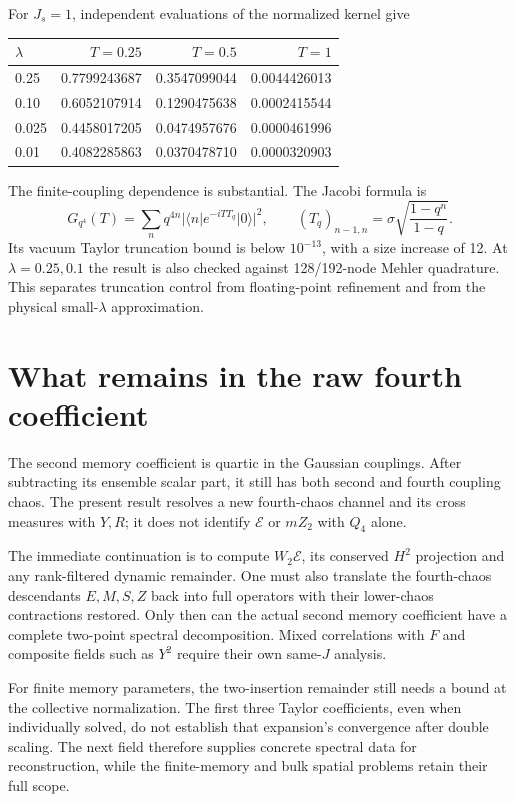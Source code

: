 \documentclass[11pt,a4paper]{article}
\begin{document}
For $J_s=1$, independent evaluations of the normalized kernel give
\begin{center}\begin{tabular}{lrrr}\toprule
$\lambda$ & $T=0.25$ & $T=0.5$ & $T=1$ \\\midrule
0.25 & 0.7799243687 & 0.3547099044 & 0.0044426013 \\
0.10 & 0.6052107914 & 0.1290475638 & 0.0002415544 \\
0.025 & 0.4458017205 & 0.0474957676 & 0.0000461996 \\
0.01 & 0.4082285863 & 0.0370478710 & 0.0000320903 \\\bottomrule
\end{tabular}\end{center}
The finite-coupling dependence is substantial. The Jacobi formula is
\begin{equation}
G_{q^4}(T)=\sum_nq^{4n}|\langle n|e^{-iTT_q}|0\rangle|^2,
\qquad (T_q)_{n-1,n}=\sigma\sqrt{\frac{1-q^n}{1-q}}.
\end{equation}
Its vacuum Taylor truncation bound is below $10^{-13}$, with a
size increase of 12. At $\lambda=0.25,0.1$ the result is also checked
against 128/192-node Mehler quadrature. This separates truncation
control from floating-point refinement and from the physical
small-$\lambda$ approximation.

\newpage
\section{What remains in the raw fourth coefficient}
The second memory coefficient is quartic in the Gaussian couplings.
After subtracting its ensemble scalar part, it still has both second
and fourth coupling chaos. The present result resolves a new
fourth-chaos channel and its cross measures with $Y,R$; it does not
identify $\mathcal E$ or $mZ_2$ with $Q_4$ alone.

The immediate continuation is to compute $W_2\mathcal E$, its
conserved $H^2$ projection and any rank-filtered dynamic remainder.
One must also translate the fourth-chaos descendants $E,M,S,Z$
back into full operators with their lower-chaos contractions restored.
Only then can the actual second memory coefficient have a complete
two-point spectral decomposition. Mixed correlations with $F$ and
composite fields such as $Y^2$ require their own same-$J$ analysis.

For finite memory parameters, the two-insertion remainder still
needs a bound at the collective normalization. The first three
Taylor coefficients, even when individually solved, do not establish
that expansion's convergence after double scaling. The next field
therefore supplies concrete spectral data for reconstruction, while
the finite-memory and bulk spatial problems retain their full scope.
\end{document}
